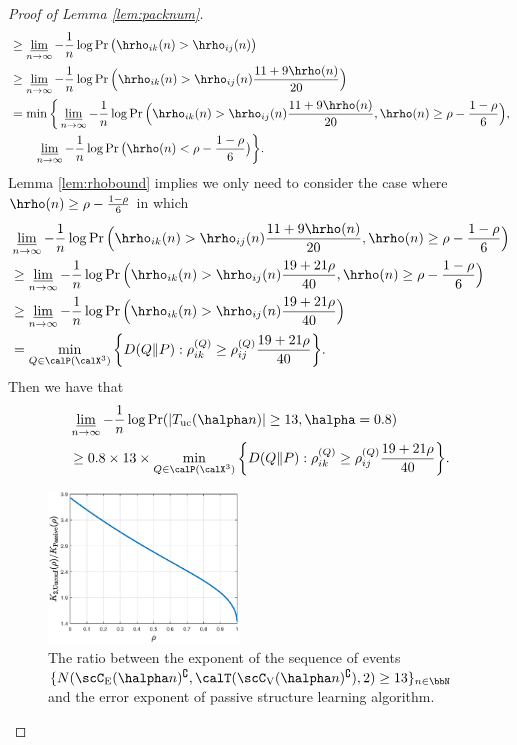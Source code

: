 \documentclass[11pt,onecolumn]{article}
\begin{document}
\begin{proof}[Proof of Lemma \ref{lem:packnum}]
\begin{align}
		&\geq \varliminf_{n\rightarrow\infty}-\frac{1}{n}\log\Pr\big(\hrho_{ik}( n)>\hrho_{ij}( n)\big)\\
		&\geq \varliminf_{n\rightarrow\infty}-\frac{1}{n}\log\Pr\Big(\hrho_{ik}( n)>\hrho_{ij}( n)\frac{11+9\hrho( n)}{20}\Big)\\
		&=\min \bigg\{\varliminf_{n\rightarrow\infty}-\frac{1}{n}\log\Pr\Big(\hrho_{ik}( n)>\hrho_{ij}( n)\frac{11+9\hrho( n)}{20},\hrho(n)\geq \rho-\frac{1-\rho}{6}\Big),\nonumber\\
		&\qquad \varliminf_{n\rightarrow\infty}-\frac{1}{n}\log\Pr\big(\hrho(n)< \rho-\frac{1-\rho}{6}\big)\bigg\}.
	\end{align}
	Lemma \ref{lem:rhobound} implies we only need to consider the case where $\hrho(n)\geq \rho-\frac{1-\rho}{6}$ in which 
	\begin{align}
		&\varliminf_{n\rightarrow\infty}-\frac{1}{n}\log\Pr\Big(\hrho_{ik}(n)>\hrho_{ij}(n)\frac{11+9\hrho(n)}{20},\hrho(n)\geq \rho-\frac{1-\rho}{6}\Big)\nonumber\\
		&\geq \varliminf_{n\rightarrow\infty}-\frac{1}{n}\log\Pr\Big(\hrho_{ik}(n)>\hrho_{ij}(n)\frac{19+21\rho}{40},\hrho(n)\geq \rho-\frac{1-\rho}{6}\Big)\\
		&\geq \varliminf_{n\rightarrow\infty}-\frac{1}{n}\log\Pr\Big(\hrho_{ik}(n)>\hrho_{ij}(n)\frac{19+21\rho}{40}\Big)\\
		&= \min_{Q\in\calP(\calX^{3})}\bigg\{D(Q\|P):\rho_{ik}^{(Q)}\geq\rho_{ij}^{(Q)}\frac{19+21\rho}{40}\bigg\}.
	\end{align}
	Then we have that
	\begin{align}
		&\varliminf_{n\rightarrow\infty}-\frac{1}{n}\log\Pr(|T_{{\rm uc}}(\halpha n)|\geq 13,\halpha=0.8)\nonumber\\
		&\geq 0.8\times 13\times\min_{Q\in\calP(\calX^{3})}\bigg\{D(Q\|P):\rho_{ik}^{(Q)}\geq\rho_{ij}^{(Q)}\frac{19+21\rho}{40}\bigg\}.
	\end{align}
	\begin{figure}[t] 
		\centering 
		\includegraphics[width=0.45\textwidth]{unconfidetriple.eps} 
		\caption{The ratio between the exponent of the sequence of events $\{N(\scC_{\mathrm{E}}(\halpha n)^{\complement},\calT(\scC_{\mathrm{V}}(\halpha n)^{\complement}),2)\geq 13\}_{n\in\bbN}$ and the error exponent of passive structure learning algorithm.} 
		\label{fig:unconfide_tri} 
	\end{figure}
	

\end{proof}
\end{document}
